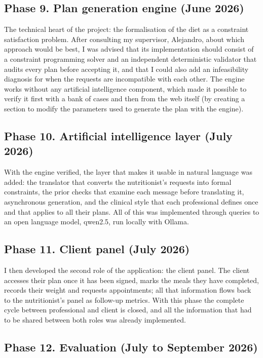 \subsection*{Phase 9. Plan generation engine (June 2026)}

The technical heart of the project: the formalisation of the diet as a constraint satisfaction problem. After consulting my supervisor, Alejandro, about which approach would be best, I was advised that its implementation should consist of a constraint programming solver and an independent deterministic validator that audits every plan before accepting it, and that I could also add an infeasibility diagnosis for when the requests are incompatible with each other. The engine works without any artificial intelligence component, which made it possible to verify it first with a bank of cases and then from the web itself (by creating a section to modify the parameters used to generate the plan with the engine).

\subsection*{Phase 10. Artificial intelligence layer (July 2026)}

With the engine verified, the layer that makes it usable in natural language was added: the translator that converts the nutritionist's requests into formal constraints, the prior checks that examine each message before translating it, asynchronous generation, and the clinical style that each professional defines once and that applies to all their plans. All of this was implemented through queries to an open language model, qwen2.5, run locally with Ollama.

\subsection*{Phase 11. Client panel (July 2026)}

I then developed the second role of the application: the client panel. The client accesses their plan once it has been signed, marks the meals they have completed, records their weight and requests appointments; all that information flows back to the nutritionist's panel as follow-up metrics. With this phase the complete cycle between professional and client is closed, and all the information that had to be shared between both roles was already implemented.

\subsection*{Phase 12. Evaluation (July to September 2026)}

